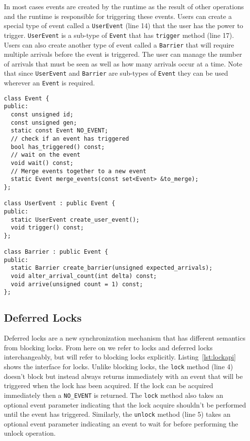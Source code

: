 In most cases events are created by the runtime as the result of other
operations and the runtime is responsible for triggering these events.  Users 
can create a special type of event called a {\tt UserEvent} (line 14) that the
user has the power to trigger.  {\tt UserEvent} is a sub-type of {\tt Event} 
that has {\tt trigger} method (line 17).  Users can also create another
type of event called a {\tt Barrier} that will require multiple arrivals before
the event is triggered.  The user can manage the number of arrivals that must
be seen as well as how many arrivals occur at a time.  Note that since {\tt UserEvent}
and {\tt Barrier} are sub-types of {\tt Event} they can be used wherever an
{\tt Event} is required.

\begin{lstlisting}[float={t},label={lst:eventapi},caption={Event Interface.}]
class Event {
public:
  const unsigned id;
  const unsigned gen;
  static const Event NO_EVENT;
  // check if an event has triggered
  bool has_triggered() const;
  // wait on the event
  void wait() const;
  // Merge events together to a new event
  static Event merge_events(const set<Event> &to_merge);
};

class UserEvent : public Event {
public:
  static UserEvent create_user_event();
  void trigger() const;
};

class Barrier : public Event {
public:
  static Barrier create_barrier(unsigned expected_arrivals);
  void alter_arrival_count(int delta) const;
  void arrive(unsigned count = 1) const;
};
\end{lstlisting}

\subsection{Deferred Locks}
\label{subsec:locks}
Deferred locks are a new synchronization mechanism that has different semantics from
blocking locks.  From here on we refer to locks and deferred locks interchangeably, 
but will refer to blocking locks explicitly.  Listing~\ref{lst:lockapi} shows the 
interface for locks.  Unlike blocking locks, the {\tt lock} method (line 4) doesn't
block but instead always returns immediately with an event that will be triggered
when the lock has been acquired.  If the lock can be acquired immediately then a {\tt NO\_EVENT}
is returned.  The {\tt lock} method also takes an optional event
parameter indicating that the lock acquire shouldn't be performed until the event
has triggered.  Similarly, the {\tt unlock} method (line 5) takes an optional event parameter indicating
an event to wait for before performing the unlock operation.

